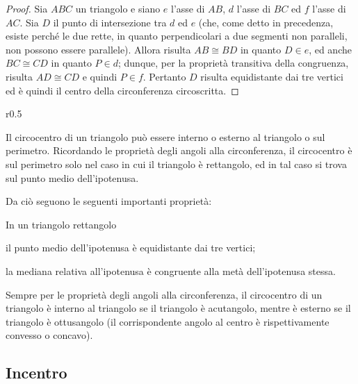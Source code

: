 \begin{inaccessibleblock}
 \begin{figure}[htb]
	\centering
\end{figure}
\end{inaccessibleblock}
\begin{proof}
Sia $ABC$ un triangolo e siano $e$ l'asse di $AB$, $d$ l'asse di $BC$ 
ed $f$ l'asse di $AC$. Sia $D$ il punto di intersezione tra $d$ ed 
$e$ (che, come detto in precedenza, esiste perché le due rette, in 
quanto perpendicolari a due segmenti non paralleli, non possono 
essere parallele). Allora risulta $AB\cong BD$ in quanto $D\in e$, ed 
anche $BC\cong CD$ in quanto $P\in d$; dunque, per la proprietà 
transitiva della congruenza, risulta $AD\cong CD$ e quindi $P\in f$. 
Pertanto $D$ risulta equidistante dai tre vertici ed è quindi il 
centro della circonferenza circoscritta.
\end{proof}

\begin{wrapfigure}{r}{0.5\textwidth}
	\centering
\end{wrapfigure}
\osservazione Il circocentro di un triangolo può essere interno o 
esterno al triangolo o sul perimetro. Ricordando le proprietà degli 
angoli alla circonferenza, il circocentro è sul perimetro solo nel 
caso in cui il triangolo è rettangolo, ed in tal caso si trova sul 
punto medio dell'ipotenusa.

Da ciò seguono le seguenti importanti proprietà:
\begin{teorema}
In un triangolo rettangolo
\begin{itemize*}
\item il punto medio dell'ipotenusa è equidistante dai tre vertici;
\item la mediana relativa all'ipotenusa è congruente alla metà 
dell'ipotenusa stessa.
\end{itemize*}
\end{teorema}

Sempre per le proprietà degli angoli alla circonferenza, il 
circocentro di un triangolo è interno al triangolo se il triangolo è 
acutangolo, mentre è esterno se il triangolo è ottusangolo (il 
corrispondente angolo al centro è rispettivamente convesso o concavo).

\subsection{Incentro}

